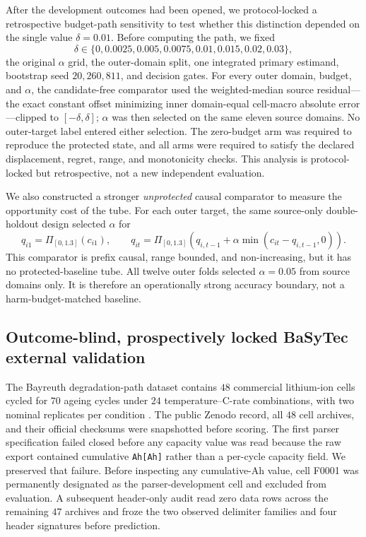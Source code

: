 \documentclass[11pt]{article}
\begin{document}
After the development outcomes had been opened, we protocol-locked a retrospective budget-path sensitivity to test whether this distinction depended on the single value $\delta=0.01$. Before computing the path, we fixed
\[
\delta\in\{0,0.0025,0.005,0.0075,0.01,0.015,0.02,0.03\},
\]
the original $\alpha$ grid, the outer-domain split, one integrated primary estimand, bootstrap seed $20{,}260{,}811$, and decision gates. For every outer domain, budget, and $\alpha$, the candidate-free comparator used the weighted-median source residual---the exact constant offset minimizing inner domain-equal cell-macro absolute error---clipped to $[-\delta,\delta]$; $\alpha$ was then selected on the same eleven source domains. No outer-target label entered either selection. The zero-budget arm was required to reproduce the protected state, and all arms were required to satisfy the declared displacement, regret, range, and monotonicity checks. This analysis is protocol-locked but retrospective, not a new independent evaluation.

We also constructed a stronger \emph{unprotected} causal comparator to measure the opportunity cost of the tube. For each outer target, the same source-only double-holdout design selected $\alpha$ for
\[
q_{i1}=\Pi_{[0,1.3]}(c_{i1}),\qquad
q_{it}=\Pi_{[0,1.3]}\!\left(q_{i,t-1}+\alpha\min(c_{it}-q_{i,t-1},0)\right).
\]
This comparator is prefix causal, range bounded, and non-increasing, but it has no protected-baseline tube. All twelve outer folds selected $\alpha=0.05$ from source domains only. It is therefore an operationally strong accuracy boundary, not a harm-budget-matched baseline.

\subsection{Outcome-blind, prospectively locked BaSyTec external validation}

The Bayreuth degradation-path dataset contains $48$ commercial lithium-ion cells cycled for $70$ ageing cycles under $24$ temperature--C-rate combinations, with two nominal replicates per condition \citep{ramasubramanian2025degradation,roder2025degradationdata}. The public Zenodo record, all $48$ cell archives, and their official checksums were snapshotted before scoring. The first parser specification failed closed before any capacity value was read because the raw export contained cumulative \texttt{Ah[Ah]} rather than a per-cycle capacity field. We preserved that failure. Before inspecting any cumulative-Ah value, cell F0001 was permanently designated as the parser-development cell and excluded from evaluation. A subsequent header-only audit read zero data rows across the remaining $47$ archives and froze the two observed delimiter families and four header signatures before prediction.
\end{document}
